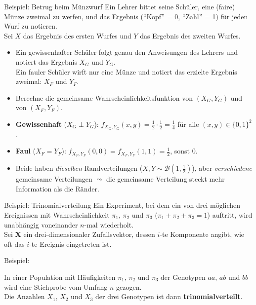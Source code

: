 \documentclass[
  10pt,
  ignorenonframetext,
]{beamer}
\providecommand{\tightlist}{%
  \setlength{\itemsep}{0pt}\setlength{\parskip}{0pt}}
\begin{document}
\begin{frame}{Beispiel: Betrug beim Münzwurf}
\protect\hypertarget{beispiel-betrug-beim-muxfcnzwurf}{}
Ein Lehrer bittet seine Schüler, eine (faire) Münze zweimal zu werfen,
und das Ergebnis (``Kopf'' = 0, ``Zahl'' = 1) für jeden Wurf zu
notieren.\\
Sei \(X\) das Ergebnis des ersten Wurfes und \(Y\) das Ergebnis des
zweiten Wurfes.

\begin{itemize}
\tightlist
\item
  Ein gewissenhafter Schüler folgt genau den Anweisungen des Lehrers und
  notiert das Ergebnis \(X_G\) und \(Y_G\).\\
  Ein fauler Schüler wirft nur eine Münze und notiert das erzielte
  Ergebnis zweimal: \(X_F\) und \(Y_F\).\\
\item
  Berechne die gemeinsame Wahrscheinlichkeitsfunktion von \((X_G, Y_G)\)
  und von \((X_F, Y_F)\).
\end{itemize}

\begin{itemize}[<+->]
\tightlist
\item
  \textbf{Gewissenhaft} (\(X_G \perp Y_G\)):
  \(f_{X_G, Y_G}(x, y) = \tfrac12 \cdot \tfrac12 = \tfrac14\) für alle
  \((x,y) \in \{0,1\}^2\).
\item
  \textbf{Faul} (\(X_F = Y_F\)):
  \(f_{X_F, Y_F}(0,0) = f_{X_F, Y_F}(1,1) = \tfrac12\), sonst \(0\).
\item
  Beide haben \emph{dieselben} Randverteilungen
  (\(X, Y \sim {\mathcal B}(1, \tfrac12)\)), aber \emph{verschiedene}
  gemeinsame Verteilungen \(\leadsto\) die gemeinsame Verteilung steckt
  mehr Information als die Ränder.
\end{itemize}

\end{frame}

\begin{frame}{Beispiel: Trinomialverteilung}
\protect\hypertarget{beispiel-trinomialverteilung}{}
Ein Experiment, bei dem ein von drei möglichen Ereignissen mit
Wahrscheinlichkeit \(\pi_1\), \(\pi_2\) und \(\pi_3\)
(\(\pi_1+\pi_2+\pi_3=1\)) auftritt, wird unabhängig voneinander
\(n\)-mal wiederholt.\\
Sei \(\symbf{X}\) ein drei-dimensionaler Zufallsvektor, dessen \(i\)-te
Komponente angibt, wie oft das \(i\)-te Ereignis eingetreten ist.

Beispiel:

In einer Population mit Häufigkeiten \(\pi_1\), \(\pi_2\) und \(\pi_3\)
der Genotypen \(aa\), \(ab\) und \(bb\) wird eine Stichprobe vom Umfang
\(n\) gezogen.\\
Die Anzahlen \(X_1\), \(X_2\) und \(X_3\) der drei Genotypen ist dann
\textbf{trinomialverteilt}.
\end{frame}
\end{document}
